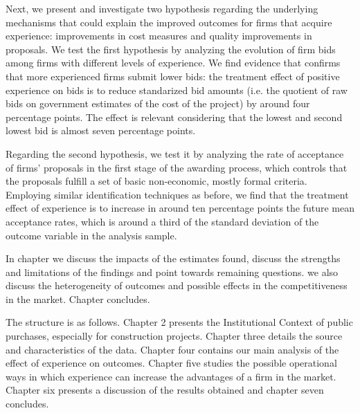  Next, we present and investigate two hypothesis regarding the underlying mechanisms that could explain the improved outcomes for firms that acquire experience: improvements in cost measures and quality improvements in proposals. We test the first hypothesis by analyzing the evolution of firm bids among firms with different levels of experience. We find evidence that confirms that more experienced firms submit lower bids: the treatment effect of positive experience on bids is to reduce standarized bid amounts (i.e. the quotient of raw bids on government estimates of the cost of the project) by around four percentage points. The effect is relevant considering that the lowest and second lowest bid is almost seven percentage points.

Regarding the second hypothesis, we test it by analyzing the rate of acceptance of firms' proposals in the first stage of the awarding process, which controls that the proposals fulfill a set of basic non-economic, mostly formal criteria.  Employing similar identification techniques as before, we find that the treatment effect of experience is to increase in around ten percentage points the future mean acceptance rates, which is around a third of the standard deviation of the outcome variable in the analysis sample.

In chapter  we discuss the impacts of the estimates found, discuss the strengths and limitations of the findings and point towards remaining questions. we also discuss the heterogeneity of outcomes and possible effects in the competitiveness in the market. Chapter concludes.

The structure is as follows. Chapter 2 presents the Institutional Context of public purchases, especially for construction projects. Chapter three details the source and characteristics of the data. Chapter four contains our main analysis of the effect of experience on outcomes. Chapter five studies the possible operational ways in which experience can increase the advantages of a firm in the market. Chapter six presents a discussion of the results obtained and chapter seven concludes.
